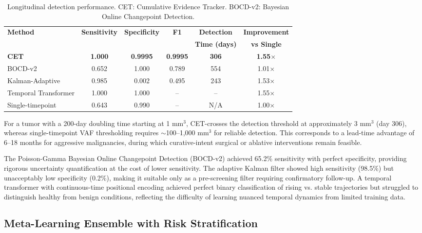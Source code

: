 \documentclass[10pt,a4paper]{article}
\begin{document}
\begin{table}[H]
\centering
\caption{Longitudinal detection performance. CET: Cumulative Evidence Tracker. BOCD-v2: Bayesian Online Changepoint Detection.}
\label{tab:longitudinal_performance}
\begin{tabular}{l c c c c c}
\toprule
\textbf{Method} & \textbf{Sensitivity} & \textbf{Specificity} & \textbf{F1} & \textbf{Detection} & \textbf{Improvement} \\
 & & & & \textbf{Time (days)} & \textbf{vs Single} \\
\midrule
\textbf{CET} & \textbf{1.000} & \textbf{0.9995} & \textbf{0.9995} & \textbf{306} & \textbf{1.55$\times$} \\
BOCD-v2 & 0.652 & 1.000 & 0.789 & 554 & 1.01$\times$ \\
Kalman-Adaptive & 0.985 & 0.002 & 0.495 & 243 & 1.53$\times$ \\
Temporal Transformer & 1.000 & 1.000 & -- & -- & 1.55$\times$ \\
Single-timepoint & 0.643 & 0.990 & -- & N/A & 1.00$\times$ \\
\bottomrule
\end{tabular}
\end{table}

For a tumor with a 200-day doubling time starting at 1 mm$^3$, CET-crosses the detection threshold at approximately 3 mm$^3$ (day 306), whereas single-timepoint VAF thresholding requires $\sim$100--1,000 mm$^3$ for reliable detection. This corresponds to a lead-time advantage of 6--18 months for aggressive malignancies, during which curative-intent surgical or ablative interventions remain feasible.

The Poisson-Gamma Bayesian Online Changepoint Detection (BOCD-v2) achieved 65.2\% sensitivity with perfect specificity, providing rigorous uncertainty quantification at the cost of lower sensitivity. The adaptive Kalman filter showed high sensitivity (98.5\%) but unacceptably low specificity (0.2\%), making it suitable only as a pre-screening filter requiring confirmatory follow-up. A temporal transformer with continuous-time positional encoding achieved perfect binary classification of rising vs. stable trajectories but struggled to distinguish healthy from benign conditions, reflecting the difficulty of learning nuanced temporal dynamics from limited training data.

\subsection{Meta-Learning Ensemble with Risk Stratification}
\label{sec:ensemble}
\end{document}
